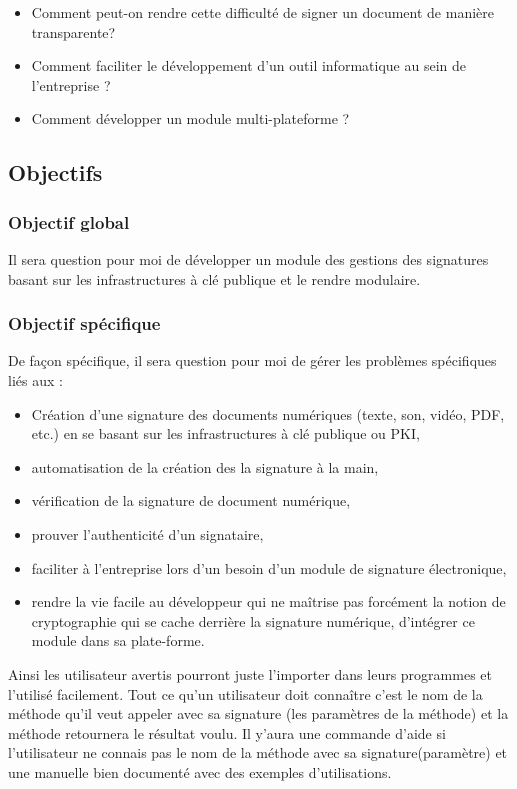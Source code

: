 \documentclass[12pt,a4paper]{article}
\begin{document}
	\begin{itemize}
		\item Comment peut-on rendre cette difficulté de signer un document de manière transparente?
		\item Comment faciliter le développement d'un outil informatique au sein de l'entreprise ?
		
		\item Comment développer un module multi-plateforme ?
	\end{itemize}
	
	
	
	\subsection{Objectifs}
		\subsubsection{Objectif global}
			Il sera question pour moi de développer un module des gestions des signatures basant sur les infrastructures à clé publique et le rendre modulaire.
		\subsubsection{Objectif spécifique}
			De façon spécifique, il sera question pour moi de gérer les problèmes spécifiques liés aux :
			\begin{itemize}
				\item Création d'une signature des documents numériques (texte, son, vidéo, PDF, etc.) en se basant sur les infrastructures à clé publique ou PKI,
				\item automatisation de la création des la signature à la main,
				\item vérification de la signature de document numérique,
				\item prouver l'authenticité d'un signataire,
				\item faciliter à l'entreprise lors d'un besoin d'un module de signature électronique,
			
				\item rendre la vie facile au développeur qui ne maîtrise pas forcément  la notion de cryptographie qui se cache derrière la signature numérique, d'intégrer ce module dans sa plate-forme.\\
			\end{itemize}
			Ainsi les utilisateur avertis pourront juste l'importer dans leurs programmes et l'utilisé facilement. Tout ce qu'un utilisateur doit connaître c'est le nom de la méthode qu'il veut appeler avec sa signature (les paramètres de la méthode) et la méthode retournera le résultat voulu. Il y'aura une commande d'aide si l'utilisateur ne connais pas le nom de la méthode  avec sa signature(paramètre) et une manuelle bien documenté avec des exemples d'utilisations.	
			
\end{document}
